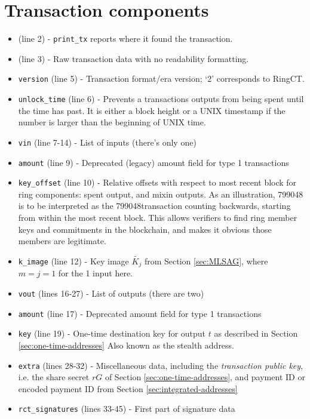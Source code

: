\begin{appendices}
\begin{Verbatim}[commandchars=\\\{\}, numbers=left]
\end{Verbatim}


\section*{Transaction components}
	
\begin{itemize}
    \item (line 2) - {\tt print\_tx} reports where it found the transaction.
    \item (line 3) - Raw transaction data with no readability formatting.
	\item {\tt version} (line 5) - Transaction format/era version; `2' corresponds to RingCT.
	\item {\tt unlock\_time} (line 6) - Prevents a transactions outputs from being spent until the time has past. It is either a block height or a UNIX timestamp if the number is larger than the beginning of UNIX time.	
	\item {\tt vin} (line 7-14) - List of inputs (there’s only one)
	\item {\tt amount} (line 9) - Deprecated (legacy) amount field for type 1 transactions
	\item {\tt key\_offset} (line 10) - Relative offsets with respect to most recent block for ring components: spent output, and mixin outputs. As an illustration, 799048 is to be interpreted as the 799048\nth transaction counting backwards, starting from within the most recent block. This allows verifiers to find ring member keys and commitments in the blockchain, and makes it obvious those members are legitimate.
	\item {\tt k\_image} (line 12) - Key image \(\tilde{K_j}\) from Section \ref{sec:MLSAG}, where $m = j = 1$ for the 1 input here.
	\item {\tt vout} (lines 16-27) - List of outputs (there are two)
	\item {\tt amount} (line 17) - Deprecated amount field for type 1 transactions
	\item {\tt key} (line 19) - One-time destination key for output $t$ as described in Section \ref{sec:one-time-addresses} Also known as the stealth address.
	\item {\tt extra} (lines 28-32) - Miscellaneous data, including the {\em transaction public key}, i.e. the share secret $r G$ of Section  \ref{sec:one-time-addresses}, and payment ID or encoded payment ID from Section \ref{sec:integrated-addresses}
	\item {\tt rct\_signatures} (lines 33-45) - First part of signature data

\end{itemize}
\end{appendices}
